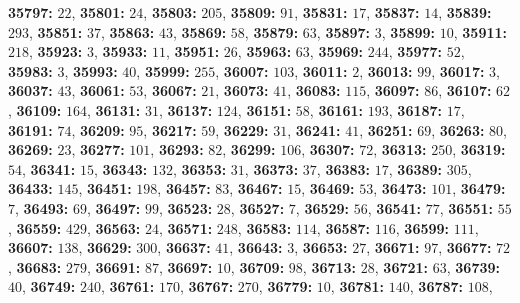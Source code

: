 \textsf{\bfseries 35797:} $22$, \textsf{\bfseries 35801:} $24$, \textsf{\bfseries 35803:} $205$, \textsf{\bfseries 35809:} $91$, \textsf{\bfseries 35831:} $17$, \textsf{\bfseries 35837:} $14$, \textsf{\bfseries 35839:} $293$, \textsf{\bfseries 35851:} $37$, \textsf{\bfseries 35863:} $43$, \textsf{\bfseries 35869:} $58$, \textsf{\bfseries 35879:} $63$, \textsf{\bfseries 35897:} $3$, \textsf{\bfseries 35899:} $10$, \textsf{\bfseries 35911:} $218$, \textsf{\bfseries 35923:} $3$, \textsf{\bfseries 35933:} $11$, \textsf{\bfseries 35951:} $26$, \textsf{\bfseries 35963:} $63$, \textsf{\bfseries 35969:} $244$, \textsf{\bfseries 35977:} $52$, \textsf{\bfseries 35983:} $3$, \textsf{\bfseries 35993:} $40$, \textsf{\bfseries 35999:} $255$, \textsf{\bfseries 36007:} $103$, \textsf{\bfseries 36011:} $2$, \textsf{\bfseries 36013:} $99$, \textsf{\bfseries 36017:} $3$, \textsf{\bfseries 36037:} $43$, \textsf{\bfseries 36061:} $53$, \textsf{\bfseries 36067:} $21$, \textsf{\bfseries 36073:} $41$, \textsf{\bfseries 36083:} $115$, \textsf{\bfseries 36097:} $86$, \textsf{\bfseries 36107:} $62$, \textsf{\bfseries 36109:} $164$, \textsf{\bfseries 36131:} $31$, \textsf{\bfseries 36137:} $124$, \textsf{\bfseries 36151:} $58$, \textsf{\bfseries 36161:} $193$, \textsf{\bfseries 36187:} $17$, \textsf{\bfseries 36191:} $74$, \textsf{\bfseries 36209:} $95$, \textsf{\bfseries 36217:} $59$, \textsf{\bfseries 36229:} $31$, \textsf{\bfseries 36241:} $41$, \textsf{\bfseries 36251:} $69$, \textsf{\bfseries 36263:} $80$, \textsf{\bfseries 36269:} $23$, \textsf{\bfseries 36277:} $101$, \textsf{\bfseries 36293:} $82$, \textsf{\bfseries 36299:} $106$, \textsf{\bfseries 36307:} $72$, \textsf{\bfseries 36313:} $250$, \textsf{\bfseries 36319:} $54$, \textsf{\bfseries 36341:} $15$, \textsf{\bfseries 36343:} $132$, \textsf{\bfseries 36353:} $31$, \textsf{\bfseries 36373:} $37$, \textsf{\bfseries 36383:} $17$, \textsf{\bfseries 36389:} $305$, \textsf{\bfseries 36433:} $145$, \textsf{\bfseries 36451:} $198$, \textsf{\bfseries 36457:} $83$, \textsf{\bfseries 36467:} $15$, \textsf{\bfseries 36469:} $53$, \textsf{\bfseries 36473:} $101$, \textsf{\bfseries 36479:} $7$, \textsf{\bfseries 36493:} $69$, \textsf{\bfseries 36497:} $99$, \textsf{\bfseries 36523:} $28$, \textsf{\bfseries 36527:} $7$, \textsf{\bfseries 36529:} $56$, \textsf{\bfseries 36541:} $77$, \textsf{\bfseries 36551:} $55$, \textsf{\bfseries 36559:} $429$, \textsf{\bfseries 36563:} $24$, \textsf{\bfseries 36571:} $248$, \textsf{\bfseries 36583:} $114$, \textsf{\bfseries 36587:} $116$, \textsf{\bfseries 36599:} $111$, \textsf{\bfseries 36607:} $138$, \textsf{\bfseries 36629:} $300$, \textsf{\bfseries 36637:} $41$, \textsf{\bfseries 36643:} $3$, \textsf{\bfseries 36653:} $27$, \textsf{\bfseries 36671:} $97$, \textsf{\bfseries 36677:} $72$, \textsf{\bfseries 36683:} $279$, \textsf{\bfseries 36691:} $87$, \textsf{\bfseries 36697:} $10$, \textsf{\bfseries 36709:} $98$, \textsf{\bfseries 36713:} $28$, \textsf{\bfseries 36721:} $63$, \textsf{\bfseries 36739:} $40$, \textsf{\bfseries 36749:} $240$, \textsf{\bfseries 36761:} $170$, \textsf{\bfseries 36767:} $270$, \textsf{\bfseries 36779:} $10$, \textsf{\bfseries 36781:} $140$, \textsf{\bfseries 36787:} $108$, 
